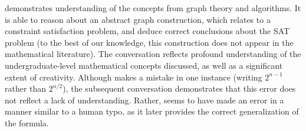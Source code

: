 {\DV} demonstrates understanding of the concepts from graph theory and algorithms. It is able to reason about an abstract graph construction, which relates to a constraint satisfaction problem, and deduce correct conclusions about the SAT problem (to the best of our knowledge, this construction does not appear in the mathematical literature). The conversation reflects profound understanding of the undergraduate-level mathematical concepts discussed, as well as a significant extent of creativity. Although {\DV} makes a mistake in one instance (writing $2^{n-1}$ rather than $2^{n/2}$), the subsequent conversation demonstrates that this error does not reflect a lack of understanding. Rather, {\DV} seems to have made an error in a manner similar to a human typo, as it later provides the correct generalization of the formula.


